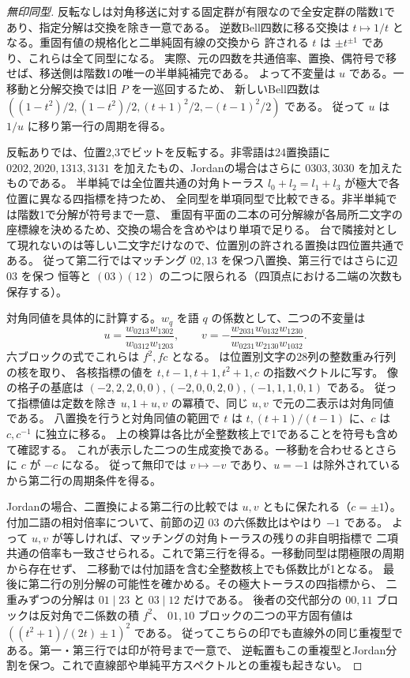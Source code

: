 \begin{proof}[無印同型]
反転なしは対角移送に対する固定群が有限なので全安定群の階数1であり、指定分解は交換を除き一意である。
逆数Bell四数に移る交換は $t\mapsto1/t$ となる。重固有値の規格化と二単純固有線の交換から
許される $t$ は $\pm t^{\pm1}$ であり、これらは全て同型になる。
実際、元の四数を共通倍率、置換、偶符号で移せば、移送側は階数1の唯一の半単純補完である。
よって不変量は $u$ である。一移動と分解交換では旧 $P$ を一巡回するため、
新しいBell四数は $((1-t^2)/2,(1-t^2)/2,(t+1)^2/2,-(t-1)^2/2)$ である。
従って $u$ は $1/u$ に移り第一行の周期を得る。

反転ありでは、位置2,3でビットを反転する。非零語は24置換語に
$0202,2020,1313,3131$ を加えたもの、Jordanの場合はさらに $0303,3030$ を加えたものである。
半単純では全位置共通の対角トーラス $l_0+l_2=l_1+l_3$ が極大で各位置に異なる四指標を持つため、
全同型を単項同型で比較できる。非半単純では階数1で分解が符号まで一意、
重固有平面の二本の可分解線が各局所二文字の座標線を決めるため、交換の場合を含めやはり単項で足りる。
台で隣接対として現れないのは等しい二文字だけなので、位置別の許される置換は四位置共通である。
従って第二行ではマッチング $02,13$ を保つ八置換、第三行ではさらに辺 $03$ を保つ
恒等と $(03)(12)$ の二つに限られる（四頂点における二端の次数も保存する）。

対角同値を具体的に計算する。$w_q$ を語 $q$ の係数として、二つの不変量は
\[
 u=\frac{w_{0213}w_{1302}}{w_{0312}w_{1203}},\qquad
 v=-\frac{w_{2031}w_{0132}w_{1230}}{w_{0231}w_{2130}w_{1032}} .
\]
六ブロックの式でこれらは $f^2,fc$ となる。
 は位置別文字の28列の整数重み行列の核を取り、
各核指標の値を $t,t-1,t+1,t^2+1,c$ の指数ベクトルに写す。
像の格子の基底は $(-2,2,2,0,0),(-2,0,0,2,0),(-1,1,1,0,1)$ である。
従って指標値は定数を除き $u,1+u,v$ の冪積で、同じ $u,v$ で元の二表示は対角同値である。
八置換を行うと対角同値の範囲で $t$ は $t,(t+1)/(t-1)$ に、$c$ は $c,c^{-1}$ に独立に移る。
上の検算は各比が全整数核上で1であることを符号も含めて確認する。
これが表示した二つの生成変換である。一移動を合わせるとさらに $c$ が $-c$ になる。
従って無印では $v\mapsto-v$ であり、$u=-1$ は除外されているから第二行の周期条件を得る。

Jordanの場合、二置換による第二行の比較では $u,v$ ともに保たれる（$c=\pm1$）。
付加二語の相対倍率について、前節の辺 $03$ の六係数比はやはり $-1$ である。
よって $u,v$ が等しければ、マッチングの対角トーラスの残りの非自明指標で
二項共通の倍率も一致させられる。これで第三行を得る。一移動同型は閉極限の周期から存在せず、
二移動では付加語を含む全整数核上でも係数比が1となる。
最後に第二行の別分解の可能性を確かめる。その極大トーラスの四指標から、
二重みずつの分解は $01\mid23$ と $03\mid12$ だけである。
後者の交代部分の $00,11$ ブロックは反対角で二係数の積 $f^2$、
$01,10$ ブロックの二つの平方固有値は $((t^2+1)/(2t)\pm1)^2$ である。
従ってこちらの印でも直線外の同じ重複型である。第一・第三行では印が符号まで一意で、
逆転置もこの重複型とJordan分割を保つ。これで直線部や単純平方スペクトルとの重複も起きない。
\end{proof}

